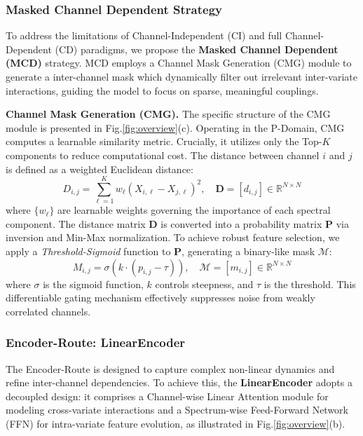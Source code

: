 \documentclass[final,3p,times]{elsarticle}
\begin{document}
\subsubsection{Masked Channel Dependent Strategy}
To address the limitations of Channel-Independent (CI) and full Channel-Dependent (CD) paradigms, we propose the \textbf{Masked Channel Dependent (MCD)} strategy. MCD employs a Channel Mask Generation (CMG) module to generate a inter-channel mask which dynamically filter out irrelevant inter-variate interactions, guiding the model to focus on sparse, meaningful couplings. 

\textbf{Channel Mask Generation (CMG).} The specific structure of the CMG module is presented in Fig.\ref{fig:overview}(c). Operating in the P-Domain, CMG computes a learnable similarity metric. Crucially, it utilizes only the Top-$K$ components to reduce computational cost. The distance between channel $i$ and $j$ is defined as a weighted Euclidean distance:
\begin{equation}
    D_{i, j} = \sum_{\ell=1}^{K} w_\ell (X_{i,\ell} - X_{j,\ell})^2, \quad \mathbf{D} = [d_{i, j}] \in \mathbb{R}^{N \times N}
\end{equation}
where $\{w_\ell\}$ are learnable weights governing the importance of each spectral component. The distance matrix $\mathbf{D}$ is converted into a probability matrix $\mathbf{P}$ via inversion and Min-Max normalization. To achieve robust feature selection, we apply a \textit{Threshold-Sigmoid} function to $\mathbf{P}$, generating a binary-like mask $\mathcal{M}$:
\begin{equation}
    M_{i, j} = \sigma\left (k \cdot (p_{i, j} - \tau)\right), \quad \mathcal{M} = [m_{i, j}] \in \mathbb{R}^{N \times N}
\end{equation}
where $\sigma$ is the sigmoid function, $k$ controls steepness, and $\tau$ is the threshold. This differentiable gating mechanism effectively suppresses noise from weakly correlated channels.

\subsubsection{Encoder-Route: LinearEncoder}
The Encoder-Route is designed to capture complex non-linear dynamics and refine inter-channel dependencies. To achieve this, the \textbf{LinearEncoder} adopts a decoupled design: it comprises a Channel-wise Linear Attention module for modeling cross-variate interactions and a Spectrum-wise Feed-Forward Network (FFN) for intra-variate feature evolution, as illustrated in Fig.\ref{fig:overview}(b).
\end{document}
